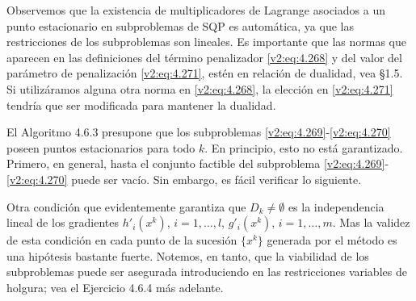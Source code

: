 Observemos que la existencia de multiplicadores de Lagrange asociados a un punto estacionario en subproblemas de SQP es automática, ya que las restricciones de los subproblemas son lineales.
Es importante que las normas que aparecen en las definiciones del término penalizador \eqref{v2:eq:4.268} y del valor del parámetro de penalización \eqref{v2:eq:4.271}, estén en relación de dualidad, vea \S 1.5. Si utilizáramos alguna otra norma en \eqref{v2:eq:4.268}, la elección en \eqref{v2:eq:4.271} tendría que ser modificada para mantener la dualidad.

El Algoritmo 4.6.3 presupone que los subproblemas \eqref{v2:eq:4.269}-\eqref{v2:eq:4.270} poseen puntos estacionarios para todo $k$. En principio, esto no está garantizado. Primero, en general, hasta el conjunto factible del subproblema \eqref{v2:eq:4.269}-\eqref{v2:eq:4.270} puede ser vacío. Sin embargo, es fácil verificar lo siguiente.


Otra condición que evidentemente garantiza que $D_k \neq \emptyset$ es la independencia lineal de los gradientes $h'_i(x^k)$, $i = 1, \dots, l$, $g'_i(x^k)$, $i = 1, \dots, m$. Mas la validez de esta condición en cada punto de la sucesión $\{x^k\}$ generada por el método es una hipótesis bastante fuerte. Notemos, en tanto, que la viabilidad de los subproblemas puede ser asegurada introduciendo en las restricciones variables de holgura; vea el Ejercicio 4.6.4 más adelante.


